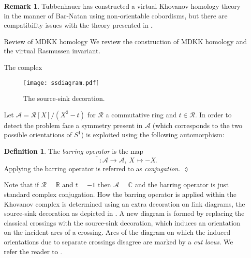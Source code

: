\documentclass[10pt,oneside]{amsart}
\theoremstyle{definition}
\newtheorem{definition}[theorem]{Definition}
\newtheorem*{remark}{Remark}
\numberwithin{equation}{section}
\DeclareRobustCommand{\CloseDef}{	\leavevmode\unskip\penalty9999 \hbox{}\nobreak\hfill
	\quad\hbox{$\lozenge$}}
\begin{document}
\begin{remark}
	Tubbenhauer \cite{Tubbenhauer2014a} has constructed a virtual Khovanov homology theory in the manner of Bar-Natan \cite{Bar-natan2005} using non-orientable cobordisms, but there are compatibility issues with the theory presented in \cite{Dye2014}.
\end{remark}

{		{\normalfont\bfseries\large}}{Review of MDKK homology}\label{Sec:DKKreview}
We review the construction of MDKK homology and the virtual Rasmussen invariant.

{		{\normalfont\bfseries}}{The complex}

\begin{figure}
	\texttt{[image: ssdiagram.pdf]}
	\caption{The source-sink decoration.}
	\label{Fig:sourcesink}
\end{figure}

Let \( \mathcal{A} = \mathcal{R}[X]/(X^2-t) \) for \( \mathcal{R} \) a commutative ring and \( t \in \mathcal{R} \). In order to detect the problem face a symmetry present in \( \mathcal{A} \) (which corresponds to the two possible orientations of \( S^1 \)) is exploited using the following automorphism:

\begin{definition}\label{barring} The \emph{barring operator} is the map
\begin{equation}
\overline{\phantom{X}} : \mathcal{A} \rightarrow \mathcal{A},~ X \mapsto -X.
\end{equation}
Applying the barring operator is referred to as \emph{conjugation}.\CloseDef
\end{definition}
Note that if \( \mathcal{R} = \mathbb{R} \) and \( t = -1 \) then \( \mathcal{A} = \mathbb{C} \) and the barring operator is just standard complex conjugation. How the barring operator is applied within the Khovanov complex is determined using an extra decoration on link diagrams, the source-sink decoration as depicted in . A new diagram is formed by replacing the classical crossings with the source-sink decoration, which induces an orientation on the incident arcs of a crossing. Arcs of the diagram on which the induced orientations due to separate crossings disagree are marked by a \emph{cut locus}. We refer the reader to \cite{Dye2014}.
\end{document}
